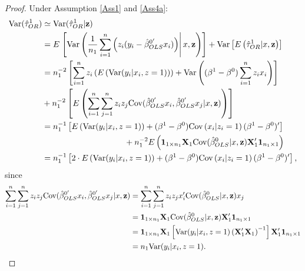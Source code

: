 \documentclass[11pt]{article}
\newcommand{\z}{{\bf z}}
\newcommand{\X}{{\bf X}}
\begin{document}
 \begin{proof}
 Under Assumption \ref{Ass1} and \ref{Ass4a}:
\begin{align*}
\mbox{Var}(\hat \tau_{OR}^1) &\simeq \mbox{Var}(\hat \tau_{OR}^1|\z)\\
&=E\left.\left[\mbox{Var}\left(\frac{1}{n_1}\sum \limits_{i =1}^n\left(z_i( y_i -\hat\beta^{0'}_{OLS}x_i) \right)\right| x,  \z \right) \right] + \mbox{Var}\left[E\left(\hat \tau_{OR}^1 | x, \z \right) \right]\\
&=n_1^{-2} \left[ \sum \limits_{i =1}^n z_i \left( E\left(\mbox{Var}(y_i|x_i, z=1)\right) \right) +\mbox{Var}\left((\beta^1-\beta^0)\sum \limits_{i =1}^nz_ix_i\right)\right] \\ 
&+n_1^{-2} \left[ E\left( \sum \limits_{i =1}^n\sum \limits_{j =1}^n z_i z_j\mbox{Cov}(\hat\beta^{0'}_{OLS}x_i,\hat\beta^{0'}_{OLS}x_j | x, \z)\right)  \right] \\
&=n_1^{-1} \left[ E\left(\mbox{Var}(y_i|x_i, z=1)\right) +(\beta^1-\beta^0)\mbox{Cov}\left(x_i|z_i=1\right)(\beta^1-\beta^0)' \right]\\
&\qquad \qquad\qquad \qquad \qquad + n_1^{-2} E \left( \boldsymbol{1}_{1\times n_1}\X_1\mbox{Cov}(\hat\beta^{0}_{OLS}| x, \z) \X_1'\boldsymbol{1}_{n_1\times1}\right)\\
&=n_1^{-1} \left[2 \cdot E\left(\mbox{Var}(y_i|x_i, z=1)\right) +(\beta^1-\beta^0)\mbox{Cov}\left(x_i|z_i=1\right)(\beta^1-\beta^0)' \right],
\end{align*}
since
\begin{align*}
\sum \limits_{i =1}^n\sum \limits_{j =1}^n z_i z_j\mbox{Cov}(\hat\beta^{0'}_{OLS}x_i,\hat\beta^{0'}_{OLS}x_j | x, \z)  &= 
\sum \limits_{i =1}^n\sum \limits_{j =1}^n z_i z_j x_i'\mbox{Cov}(\hat\beta^{0}_{OLS}| x, \z) x_j\\
&=\boldsymbol{1}_{1\times n_1}\X_1\mbox{Cov}(\hat\beta^{0}_{OLS}| x, \z) \X_1'\boldsymbol{1}_{n_1\times1}\\
&=\boldsymbol{1}_{1\times n_1}\X_1\left[\mbox{Var}(y_i|x_i, z=1) \left(\X_1' \X_1\right)^{-1} \right] \X_1'\boldsymbol{1}_{n_1\times1}\\
&=n_1 \mbox{Var}(y_i|x_i, z=1).
\end{align*}
\end{proof}
\end{document}
